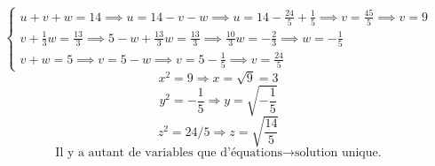 \documentclass{article}
\begin{document}
\[ \begin{cases} 
u + v + w = 14 \implies u = 14 - v - w \implies u = 14 - \frac{24}{5} + \frac{1}{5} \implies v = \frac{45}{5} \implies v = 9\\ 
v + \frac{1}{3} w = \frac{13}{3} \implies 5 - w + \frac{13}{3} w = \frac{13}{3} \implies \frac{10}{3}w = -\frac{2}{3} \implies w = -\frac{1}{5} \\ 
v + w = 5 \implies v = 5 - w \implies v = 5 - \frac{1}{5} \implies v = \frac{24}{5}
\end{cases} \]
\[ x^2 = 9 \Rightarrow x = \sqrt{9} = 3 \]
\[ y^2 = -\frac{1}{5} \Rightarrow y = \sqrt{-\frac{1}{5}} \]
\[ z^2 = 24/5 \Rightarrow z = \sqrt{\frac{14}{5}} \]
\[ \text{Il y a autant de variables que d'équations} \rightarrow \text{solution unique.} \]
\end{document}
